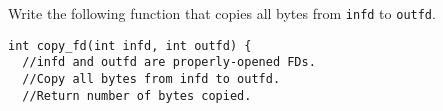 
Write the following function that copies all bytes from \verb|infd| to \verb|outfd|.

\begin{small}
\begin{verbatim}
int copy_fd(int infd, int outfd) {
  //infd and outfd are properly-opened FDs.
  //Copy all bytes from infd to outfd.
  //Return number of bytes copied.
\end{verbatim}
\end{small}

